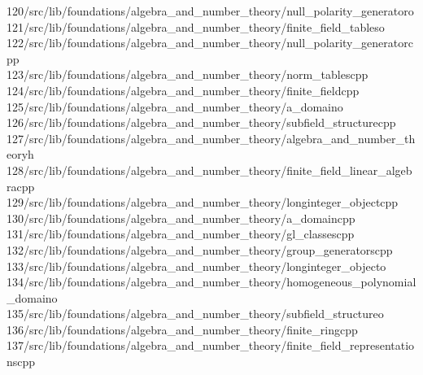\begin{tabbing}
120\>/src/lib/foundations/algebra\_and\_number\_theory/null\_polarity\_generatoro\\[0pt]
121\>/src/lib/foundations/algebra\_and\_number\_theory/finite\_field\_tableso\\[0pt]
122\>/src/lib/foundations/algebra\_and\_number\_theory/null\_polarity\_generatorcpp\\[0pt]
123\>/src/lib/foundations/algebra\_and\_number\_theory/norm\_tablescpp\\[0pt]
124\>/src/lib/foundations/algebra\_and\_number\_theory/finite\_fieldcpp\\[0pt]
125\>/src/lib/foundations/algebra\_and\_number\_theory/a\_domaino\\[0pt]
126\>/src/lib/foundations/algebra\_and\_number\_theory/subfield\_structurecpp\\[0pt]
127\>/src/lib/foundations/algebra\_and\_number\_theory/algebra\_and\_number\_theoryh\\[0pt]
128\>/src/lib/foundations/algebra\_and\_number\_theory/finite\_field\_linear\_algebracpp\\[0pt]
129\>/src/lib/foundations/algebra\_and\_number\_theory/longinteger\_objectcpp\\[0pt]
130\>/src/lib/foundations/algebra\_and\_number\_theory/a\_domaincpp\\[0pt]
131\>/src/lib/foundations/algebra\_and\_number\_theory/gl\_classescpp\\[0pt]
132\>/src/lib/foundations/algebra\_and\_number\_theory/group\_generatorscpp\\[0pt]
133\>/src/lib/foundations/algebra\_and\_number\_theory/longinteger\_objecto\\[0pt]
134\>/src/lib/foundations/algebra\_and\_number\_theory/homogeneous\_polynomial\_domaino\\[0pt]
135\>/src/lib/foundations/algebra\_and\_number\_theory/subfield\_structureo\\[0pt]
136\>/src/lib/foundations/algebra\_and\_number\_theory/finite\_ringcpp\\[0pt]
137\>/src/lib/foundations/algebra\_and\_number\_theory/finite\_field\_representationscpp\\[0pt]

\end{tabbing}

